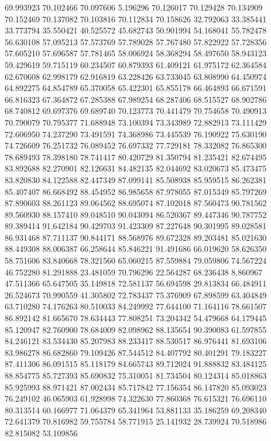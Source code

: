 69.993923
70.102466
70.097606
5.196296
70.126017
70.129428
70.134909
70.152469
70.137082
70.103816
70.112834
70.158626
32.792063
33.385441
33.773794
35.550421
40.525572
45.682743
50.901994
54.168041
55.782478
56.630108
57.095213
57.573769
57.789028
57.767480
57.822922
57.728356
57.605210
57.696587
57.781465
58.006924
58.368294
58.497650
58.943123
59.429619
59.715119
60.234507
60.879393
61.409121
61.975172
62.364584
62.670608
62.998179
62.916819
63.228426
63.733045
63.808990
64.450974
64.892275
64.854789
65.370058
65.422301
65.855178
66.464893
66.671591
66.816323
67.364872
67.285388
67.989254
68.287406
68.515527
68.902786
68.740812
69.697376
69.689740
70.123773
70.441479
70.754658
70.490913
70.790079
70.795377
71.688948
73.100394
73.343989
72.882913
73.111429
72.606950
74.237290
73.491591
74.368986
73.445539
76.190922
75.630190
74.726609
76.251732
76.089452
76.697332
77.729181
78.332082
76.865300
78.689493
78.398180
78.741417
80.420729
81.350794
81.235421
82.674495
83.892688
82.270901
82.126631
84.482135
82.044692
83.020673
85.473475
83.820830
84.122588
82.447349
87.099141
85.508938
85.959515
86.262381
85.407407
86.668492
88.454952
86.985658
87.978055
87.015349
85.797269
87.890603
88.261123
89.064562
88.695074
87.102018
87.560473
90.781562
89.560930
88.157410
89.048510
90.043094
86.520367
89.447346
90.787752
89.389414
91.642184
90.429703
91.423309
87.227648
90.301995
89.028581
86.931468
87.711137
90.844171
88.568976
89.672328
89.203481
85.021630
88.449308
88.006387
66.258644
85.846221
91.491686
66.019620
58.626350
58.751606
83.840668
78.321560
65.060215
87.559884
79.059806
74.567224
46.752280
81.291888
23.481059
70.796296
22.564287
68.236438
8.860967
47.511366
65.647505
35.149818
72.581137
56.694598
29.813834
66.484911
26.524673
70.990559
41.305802
72.783437
75.376909
67.898599
63.404849
63.710280
74.176263
80.510033
84.249992
77.644100
71.164116
78.661507
86.892142
81.665670
78.634443
77.808251
73.204342
54.479668
64.179445
85.120947
82.760900
78.684009
82.098962
88.135654
90.390083
61.597855
84.246121
83.534430
85.207983
88.233417
88.530517
86.976441
81.693106
83.986278
86.682860
79.109426
87.544512
84.407792
80.401291
79.183227
87.411306
86.091515
85.118179
84.665743
89.712024
91.888832
83.484125
88.854775
85.727393
85.690832
75.310051
81.734504
80.124314
85.018863
85.925993
88.971421
87.002434
85.717842
77.156354
86.147820
85.093023
76.249102
46.065903
61.928998
74.322630
77.860368
76.615321
76.696110
80.313514
60.166977
71.064379
65.341964
53.881133
35.186259
69.208340
72.641379
70.816982
59.755784
58.771915
25.141932
28.739924
70.518986
82.815082
53.109856
